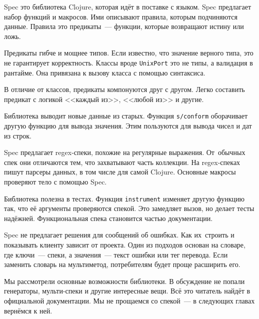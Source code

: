 Spec это библиотека Clojure, которая идёт в поставке с языком. Spec предлагает
набор функций и макросов. Ими описывают правила, которым подчиняются
данные. Правила это предикаты~--- функции, которые возвращают истину или ложь.

Предикаты гибче и мощнее типов. Если известно, что значение верного типа, это не
гарантирует корректность. Классы вроде \verb|UnixPort| это не типы, а
валидация в рантайме. Она привязана к вызову класса с помощью синтаксиса.

В отличие от классов, предикаты компонуются друг с другом. Легко составить
предикат с логикой <<каждый из>>, <<любой из>> и другие.

Библиотека выводит новые данные из старых. Функция \verb|s/conform|
оборачивает другую функцию для вывода значения. Этим пользуются для вывода чисел
и дат из строк.

Spec предлагает regex-спеки, похожие на регулярные выражения. От~обычных спек
они отличаются тем, что захватывают часть коллекции. На regex-спеках пишут
парсеры данных, в том числе для самой Clojure. Основные макросы проверяют тело с
помощью Spec.

Библиотека полезна в тестах. Функция \verb|instrument| изменяет другую функцию
так, что её аргументы проверяются спекой. Это замедляет вызов, но делает тесты
надёжней. Функциональная спека становится частью документации.

Spec не предлагает решения для сообщений об ошибках. Как их~строить и показывать
клиенту зависит от проекта. Один из подходов основан на словаре, где ключи~---
спеки, а значения~--- текст ошибки или тег перевода. Если заменить словарь на
мультиметод, потребителям будет проще расширить его.

Мы рассмотрели основные возможности библиотеки. В обсуждение не попали
генераторы, мульти-спеки и другие интересные вещи. Всё это читатель
найдёт в официальной документации. Мы не прощаемся со спекой~--- в следующих
главах вернёмся к ней.
